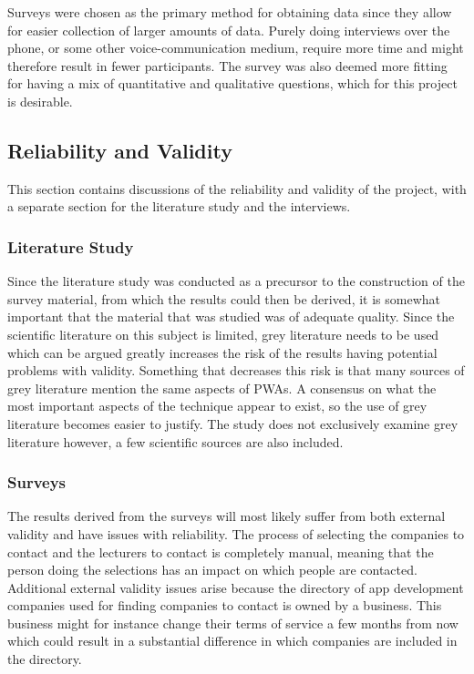 \documentclass[a4paper,12pt]{article}
\begin{document}
Surveys were chosen as the primary method for obtaining data since they allow for easier collection of larger amounts of data. Purely doing interviews over the phone, or some other voice-communication medium, require more time and might therefore result in fewer participants. The survey was also deemed more fitting for having a mix of quantitative and qualitative questions, which for this project is desirable.

\subsection{Reliability and Validity}
\label{Method_reliabilityValidity}
This section contains discussions of the reliability and validity of the project, with a separate section for the literature study and the interviews.

\subsubsection{Literature Study}
\label{Method_reliabilityValidity_study}
Since the literature study was conducted as a precursor to the construction of the survey material, from which the results could then be derived, it is somewhat important that the material that was studied was of adequate quality. Since the scientific literature on this subject is limited, grey literature needs to be used which can be argued greatly increases the risk of the results having potential problems with validity. Something that decreases this risk is that many sources of grey literature mention the same aspects of PWAs. A consensus on what the most important aspects of the technique appear to exist, so the use of grey literature becomes easier to justify. The study does not exclusively examine grey literature however, a few scientific sources are also included.

\subsubsection{Surveys}
\label{Method_reliabilityValidity_surveys}
The results derived from the surveys will most likely suffer from both external validity and have issues with reliability. The process of selecting the companies to contact and the lecturers to contact is completely manual, meaning that the person doing the selections has an impact on which people are contacted. Additional external validity issues arise because the directory of app development companies used for finding companies to contact is owned by a business. This business might for instance change their terms of service a few months from now which could result in a substantial difference in which companies are included in the directory.
\end{document}

